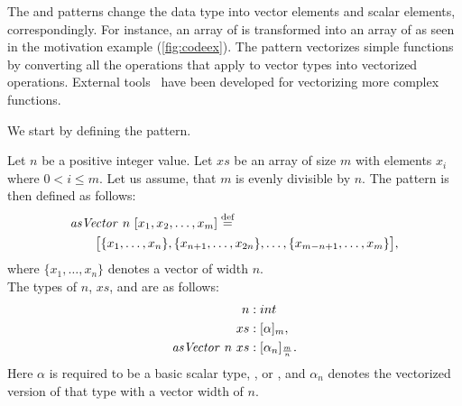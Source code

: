 The \asVector and \asScalar patterns change the data type into vector elements and scalar elements, correspondingly.
For instance, an array of  is transformed into an array of  as seen in the motivation example (\autoref{fig:codeex}).
The \vect pattern vectorizes simple functions by converting all the operations that apply to vector types into vectorized operations.
External tools~\cite{KarrenbergHa2011} have been developed for vectorizing more complex functions.

\bigskip

We start by defining the \asVector pattern.
\begin{definition}
  \label{definition:pattern:asVector}
  Let $n$ be a positive integer value.
  Let $xs$ be an array of size $m$ with elements $x_i$ where $0 < i \leq m$.
  Let us assume, that $m$ is evenly divisible by $n$.
  The \asVector pattern is then defined as follows:
  \begin{align*}
    &\text{\textit{asVector}}\ n\ [x_1, x_2, \dots, x_m] \stackrel{\textrm{\scriptsize def}}{=} \\
    &\qquad\big[\{x_1, \ldots, x_n\}, \{x_{n+1}, \ldots, x_{2n}\}, \ldots, \{x_{m-n+1}, \ldots, x_m\}\big],
  \end{align*}
  where $\{x_1,\ldots,x_n\}$ denotes a vector of width $n$.\\
  The types of $n$, $xs$, and \asVector are as follows:
  \begin{align*}
    n &: int\\
    xs &: [\alpha]_m,\\
    \text{\textit{asVector}}\ n\ xs &: [\alpha_n]_{\frac{m}{n}} .
  \end{align*}
  Here $\alpha$ is required to be a basic scalar type, \eg,  or , and $\alpha_n$ denotes the vectorized version of that type with a vector width of $n$.
\end{definition}

